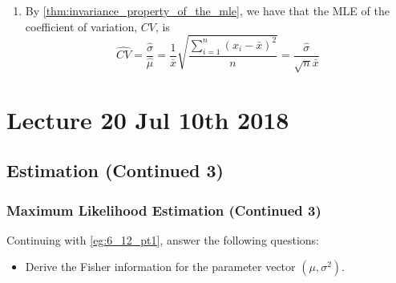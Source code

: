 \documentclass[notoc,notitlepage]{tufte-book}
\begin{document}
\begin{solution}
\begin{enumerate}
    \item By \cref{thm:invariance_property_of_the_mle}, we have that the MLE of the coefficient of variation, $CV$, is
      \begin{equation*}
        \hat{CV} = \frac{\hat{\sigma}}{\hat{\mu}} = \frac{1}{\bar{x}} \sqrt{ \frac{\sum_{i=1}^{n} (x_i - \bar{x})^2}{n} } = \frac{\hat{\sigma}}{\sqrt{n} \bar{x}}
      \end{equation*}
  \end{enumerate}
\end{solution}




\chapter{Lecture 20 Jul 10th 2018}%
\label{chp:lecture_20_jul_10th_2018}

\section{Estimation (Continued 3)}%
\label{sec:estimation_continued_3}

\subsection{Maximum Likelihood Estimation (Continued 3)}%
\label{sub:maximum_likelihood_estimation_continued_3}

\begin{eg}\label{eg:6_12_pt2} 
  Continuing with \cref{eg:6_12_pt1}, answer the following questions:
  \begin{itemize}
    \item Derive the Fisher information for the parameter vector $(\mu, \sigma^2)$.
  \end{itemize}
\end{eg}
\end{document}
